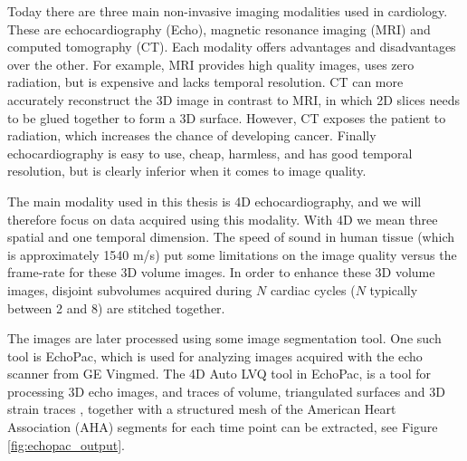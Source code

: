 Today there are three main non-invasive imaging modalities used in
cardiology. These are echocardiography (Echo), magnetic
resonance imaging (MRI) and computed tomography (CT). Each
modality offers advantages and disadvantages over the other.
For example, MRI provides
high quality images, uses zero radiation, but is expensive and lacks
temporal resolution. CT can more accurately reconstruct the 3D image
in contrast to MRI, in which 2D slices needs to be glued together to
form a 3D surface. However, CT exposes the patient to radiation, which
increases the chance of developing cancer. Finally echocardiography is
easy to use, cheap, harmless, and  has good temporal resolution, but
is clearly inferior when it comes to image quality. 


The main modality used in this thesis is 4D echocardiography, and we
will therefore focus on data acquired using this modality.
With 4D we mean three spatial and one temporal dimension.
The speed of sound in human tissue (which is approximately 1540 m/s)
put some limitations on the image quality versus the frame-rate
\cite{rabben2010technical} for these 3D volume images. In order to
enhance these 3D volume images, disjoint subvolumes acquired during
$N$ cardiac cycles ($N$ typically between 2 and
8)\cite{brekke2007volume} are stitched together.  

The images are later processed using some image segmentation tool.
One such tool is EchoPac, which is used for analyzing images acquired with
the echo scanner from GE Vingmed. The 4D Auto LVQ tool in EchoPac, is
a tool for processing 3D echo images, and traces of volume,
triangulated surfaces and 3D strain traces \cite{heimdal20114d},
together with a structured mesh of the American Heart Association (AHA) segments
\cite{cerqueira2002standardized} for each time point can be extracted, see Figure
\ref{fig:echopac_output}. 

